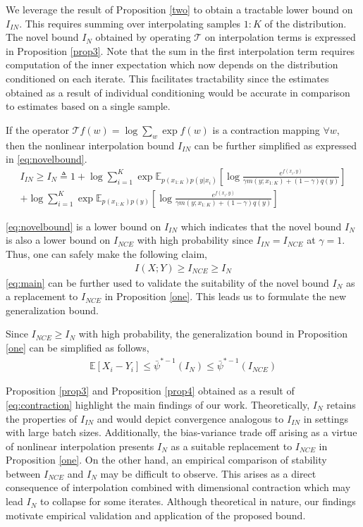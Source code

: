 \documentclass{article}
\begin{document}
We leverage the result of Proposition \autoref{two} to obtain a tractable lower bound on $I_{IN}$. This requires summing over interpolating samples $1:K$ of the distribution. The novel bound $I_{N}$ obtained by operating $\mathcal{T}$ on interpolation terms is expressed in Proposition \autoref{prop3}. Note that the sum in the first interpolation term requires computation of the inner expectation which now depends on the distribution conditioned on each iterate. This facilitates tractability since the estimates obtained as a result of individual conditioning would be accurate in comparison to estimates based on a single sample. 
\begin{customthm}{3}\label{prop3}
  If the operator $\mathcal{T}f(w)=\log \sum_{w} \exp{f(w)}$ is a contraction mapping $\forall w$, then the nonlinear interpolation bound $I_{IN}$ can be further simplified as expressed in \autoref{eq:novelbound}. 
\begin{multline}  
  I_{IN} \geq I_{N} \triangleq 1 + \log \sum_{i=1}^{K} \exp{\mathbb{E}_{p(x_{1:K})p(y|x_{i})}[\log\frac{e^{f(x_{i},y)}}{\gamma m(y;x_{1:K})+(1-\gamma)q(y)}]}\\ + \log \sum_{i=1}^{K} \exp{\mathbb{E}_{p(x_{1:K})p(y)}[\log\frac{e^{f(x_{i},y)}}{\gamma m(y;x_{1:K})+(1-\gamma)q(y)}]} \label{eq:novelbound}
\end{multline} 
\label{novelbound} 
\end{customthm}
\autoref{eq:novelbound} is a lower bound on $I_{IN}$ which indicates that the novel bound $I_{N}$ is also a lower bound on $I_{NCE}$ with high probability since $I_{IN} = I_{NCE}$ at $\gamma=1$. Thus, one can safely make the following claim,
\begin{gather}
  I(X;Y) \geq I_{NCE} \geq I_{N} \label{eq:main}
\end{gather}
\autoref{eq:main} can be further used to validate the suitability of the novel bound $I_{N}$ as a replacement to $I_{NCE}$ in Proposition \autoref{one}. This leads us to formulate the new generalization bound.
\begin{customthm}{4}\label{prop4}
  Since $I_{NCE} \geq I_{N}$ with high probability, the generalization bound in Proposition \autoref{one} can be simplified as follows,
  \begin{gather}
    \mathbb{E}[X_{i} - Y_{i}] \leq \bar{\psi}^{*-1}(I_{N}) \leq \bar{\psi}^{*-1}(I_{NCE})
  \end{gather} 
\end{customthm}
Proposition \autoref{prop3} and Proposition \autoref{prop4} obtained as a result of \autoref{eq:contraction} highlight the main findings of our work. Theoretically, $I_{N}$ retains the properties of $I_{IN}$ and would depict convergence analogous to $I_{IN}$ in settings with large batch sizes. Additionally, the bias-variance trade off arising as a virtue of nonlinear interpolation presents $I_{N}$ as a suitable replacement to $I_{NCE}$ in Proposition \autoref{one}. On the other hand, an empirical comparison of stability between $I_{NCE}$ and $I_{N}$ may be difficult to observe. This arises as a direct consequence of interpolation combined with dimensional contraction which may lead $I_{N}$ to collapse for some iterates. Although theoretical in nature, our findings motivate empirical validation and application of the proposed bound. 
\end{document}
